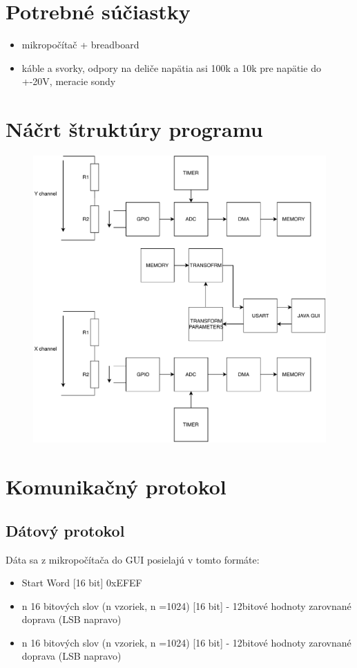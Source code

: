 \documentclass{article}
\begin{document}
	\section{Potrebné súčiastky}
		\begin{itemize}
		\item mikropočítač + breadboard
		\item káble a svorky, odpory na deliče napätia asi 100k a 10k pre napätie do +-20V, meracie sondy
	\end{itemize}
	\section{Náčrt štruktúry programu}
	
	\begin{figure}[h!]
		\centering
		\includegraphics[width=\linewidth]{../Obrazky/basicstructure.pdf}
	\end{figure}


	\pagebreak
	\section{Komunikačný protokol}
	\subsection{Dátový protokol}
	Dáta sa z mikropočítača do GUI posielajú v tomto formáte:
		\begin{itemize}
			\item Start Word [16 bit]	0xEFEF
			\item n 16 bitových slov (n vzoriek, n =1024) [16 bit] - 12bitové hodnoty zarovnané doprava (LSB napravo)
			\item n 16 bitových slov (n vzoriek, n =1024) [16 bit] - 12bitové hodnoty zarovnané doprava (LSB napravo)
		\end{itemize}
		
\end{document}
